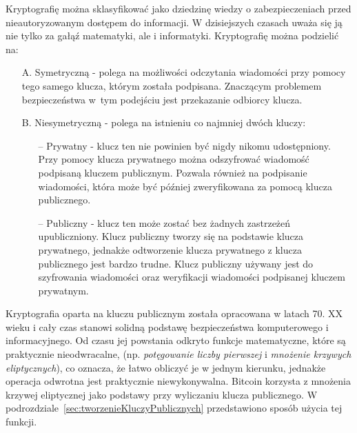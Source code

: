 \documentclass[12pt, twoside, final, openany]{mgr}
\begin{document}
\indent Kryptografię można sklasyfikować jako dziedzinę wiedzy o zabezpieczeniach przed nieautoryzowanym dostępem do informacji. W dzisiejszych czasach uważa się ją nie tylko za gałąź matematyki, ale i informatyki. Kryptografię można podzielić na:
\begin{itemize}
\item[A.] Symetryczną - polega na możliwości odczytania wiadomości przy pomocy tego samego klucza, którym została podpisana. Znaczącym problemem bezpieczeństwa w~tym podejściu jest przekazanie odbiorcy klucza. 
\item[B.] Niesymetryczną\cite{CryptoDenga, asynchModel} - polega na istnieniu co najmniej dwóch kluczy:
\begin{itemize}
\item[--] Prywatny - klucz ten nie powinien być nigdy nikomu udostępniony. Przy pomocy klucza prywatnego można odszyfrować wiadomość podpisaną kluczem publicznym. Pozwala również na podpisanie wiadomości, która może być później zweryfikowana za pomocą klucza publicznego.
\item[--] Publiczny - klucz ten może zostać bez żadnych zastrzeżeń upubliczniony. Klucz publiczny tworzy się na podstawie klucza prywatnego, jednakże odtworzenie klucza prywatnego z klucza publicznego jest bardzo trudne. Klucz publiczny używany jest do szyfrowania wiadomości oraz weryfikacji wiadomości podpisanej kluczem prywatnym.
\end{itemize}
\end{itemize} 

\indent Kryptografia oparta na kluczu publicznym została opracowana w latach 70. XX wieku i cały czas stanowi solidną podstawę bezpieczeństwa komputerowego i informacyjnego. Od czasu jej powstania odkryto funkcje matematyczne, które są praktycznie nieodwracalne, (np. \textit{potęgowanie liczby pierwszej} i \textit{mnożenie krzywych eliptycznych}), co oznacza, że łatwo obliczyć je w jednym kierunku, jednakże operacja odwrotna jest praktycznie niewykonywalna. Bitcoin korzysta z mnożenia krzywej eliptycznej jako podstawy przy wyliczaniu klucza publicznego. W podrozdziale~\ref{sec:tworzenieKluczyPublicznych} przedstawiono sposób użycia tej funkcji.
\end{document}
